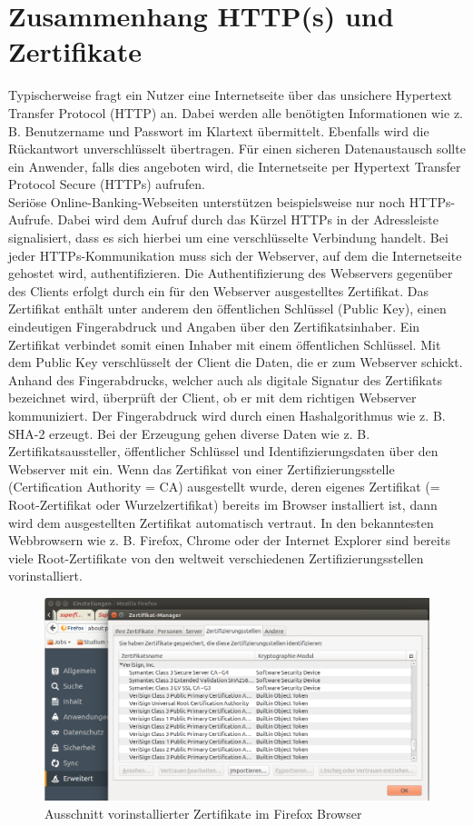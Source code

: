 \section{Zusammenhang HTTP(s) und Zertifikate}
\label{sec:HTTPs}
Typischerweise fragt ein Nutzer eine Internetseite über das unsichere Hypertext Transfer Protocol (HTTP) an. Dabei werden alle benötigten Informationen wie z. B. Benutzername und Passwort im Klartext übermittelt. Ebenfalls wird die Rückantwort unverschlüsselt übertragen. Für einen sicheren Datenaustausch sollte ein Anwender, falls dies angeboten wird, die Internetseite per Hypertext Transfer Protocol Secure (HTTPs) aufrufen. \cite[vgl.]{RFC7230} 
\\Seriöse Online-Banking-Webseiten unterstützen beispielsweise nur noch HTTPs-Aufrufe. Dabei wird dem Aufruf durch das Kürzel HTTPs in der Adressleiste signalisiert, dass es sich hierbei um eine verschlüsselte Verbindung handelt. Bei jeder HTTPs-Kommunikation muss sich der Webserver, auf dem die Internetseite gehostet wird, authentifizieren. Die Authentifizierung des Webservers gegenüber des Clients erfolgt durch ein für den Webserver ausgestelltes Zertifikat. 
Das Zertifikat enthält unter anderem den öffentlichen Schlüssel (Public Key), einen eindeutigen Fingerabdruck und Angaben über den Zertifikatsinhaber. Ein Zertifikat verbindet somit einen Inhaber mit einem öffentlichen Schlüssel. Mit dem Public Key verschlüsselt der Client die Daten, die er zum Webserver schickt. Anhand des Fingerabdrucks, welcher auch als digitale Signatur des Zertifikats bezeichnet wird, überprüft der Client, ob er mit dem richtigen Webserver kommuniziert. Der Fingerabdruck wird durch einen Hashalgorithmus wie z. B. SHA-2 erzeugt. Bei der Erzeugung gehen diverse Daten wie z. B. Zertifikatsaussteller, öffentlicher Schlüssel und Identifizierungsdaten über den Webserver mit ein. 
Wenn das Zertifikat von einer Zertifizierungsstelle (Certification Authority = CA) ausgestellt wurde, deren eigenes Zertifikat (= Root-Zertifikat oder Wurzelzertifikat) bereits im Browser installiert ist, dann wird dem ausgestellten Zertifikat automatisch vertraut. In den bekanntesten Webbrowsern wie z. B. Firefox, Chrome oder der Internet Explorer sind bereits viele Root-Zertifikate von den weltweit verschiedenen Zertifizierungsstellen vorinstalliert.
\begin{figure}[H]
		\centering
		\includegraphics[width=1\linewidth]{images/firefox_installierte_zertifikate.png}
		\caption{Ausschnitt vorinstallierter Zertifikate im Firefox Browser}
\end{figure}
